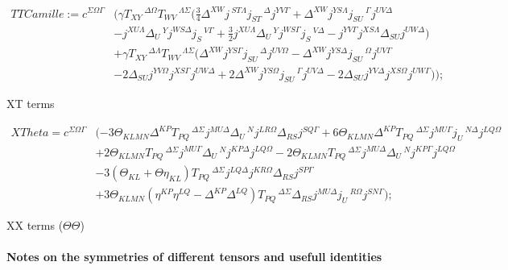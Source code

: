 \documentclass[11pt]{article}
\begin{document}
\begin{equation}
\begin{split}
TTCamille:=c^{\Sigma \Omega \Gamma}
&(\gamma T_{X Y}\,^{\Delta \Omega} T_{W V}\,^{\Lambda \Sigma}(\frac34 \Delta^{X W} j\,^{S T \Lambda} j_{S T}\,^{\Delta} j^{Y V \Gamma}
+\Delta^{X W} j^{Y S \Lambda} j_{S U}\,^{\Gamma} j^{U V \Delta} \\
&-j^{X U \Lambda} \Delta_{U}\,^{Y} j^{W S \Delta} j_{S}\,^{V \Gamma}
+\frac32 j^{X U \Lambda} \Delta_{U}\,^{Y} j^{W S \Gamma} j_{S}\,^{V \Delta}
-j^{Y V \Gamma} j^{X S \Lambda} \Delta_{S U} j^{U W \Delta})\\
&+\gamma T_{X Y}\,^{\Delta \Lambda} T_{W V}\,^{\Lambda \Sigma}(\Delta^{X W} j^{Y S \Gamma} j_{S U}\,^{\Delta} j^{U V \Omega}
-\Delta^{X W} j^{Y S \Delta} j_{S U}\,^{\Omega} j^{U V \Gamma}\\
&-2\Delta_{S U} j^{Y V \Omega} j^{X S \Gamma} j^{U W \Delta}
+2\Delta^{X W} j^{Y S \Omega} j_{S U}\,^{\Gamma} j^{U V \Delta}
-2\Delta_{S U} j^{Y V \Delta} j^{X S \Omega} j^{U W \Gamma}));
\end{split}
\end{equation}

XT terms 

\begin{equation}
	\begin{split}
		XTheta=c^{\Sigma \Omega \Gamma}&(-3 \Theta_{K L M N} \Delta^{K P} T_{P Q}\,^{\Delta \Sigma} j^{M U \Delta} \Delta_{U}\,^{N} j^{L R \Omega} \Delta_{R S} j^{S Q \Gamma}
		+6 \Theta_{K L M N} \Delta^{K P} T_{P Q}\,^{\Delta \Sigma} j^{M U \Gamma} j_{U}\,^{N \Delta} j^{L Q \Omega} \\
		&+2 \Theta_{K L M N} T_{P Q}\,^{\Delta \Sigma} j^{M U \Gamma} \Delta_{U}\,^{N} j^{K P \Delta} j^{L Q \Omega}
		-2 \Theta_{K L M N} T_{P Q}\,^{\Delta \Sigma} j^{M U \Delta} \Delta_{U}\,^{N} j^{K P \Gamma} j^{L Q \Omega}\\
		&-3 (\Theta_{K L}+\Theta \eta_{K L}) T_{P Q}\,^{\Delta \Sigma} j^{L Q \Delta} j^{K R \Omega} \Delta_{R S} j^{S P \Gamma}\\ 
		&+3 \Theta_{K L M N} (\eta^{K P} \eta^{L Q}- \Delta^{K P} \Delta^{L Q}) T_{P Q}\,^{\Delta \Sigma} \Delta_{R S} j^{M U \Delta} j_{U}\,^{R \Omega} j^{S N \Gamma});
	\end{split}
\end{equation}

XX terms ($\Theta \Theta$)

\paragraph{Notes on the symmetries of different tensors and usefull identities}
\end{document}
